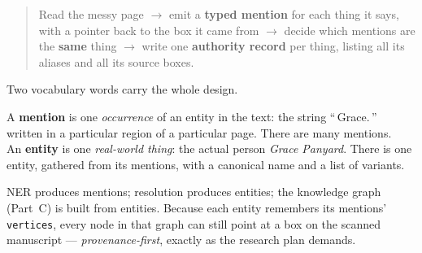 \documentclass[11pt]{article}
\newcommand{\code}[1]{\texttt{#1}}
\begin{document}
\begin{quote}
Read the messy page $\to$ emit a \textbf{typed mention} for each thing it says,
with a pointer back to the box it came from $\to$ decide which mentions are the
\textbf{same} thing $\to$ write one \textbf{authority record} per thing, listing
all its aliases and all its source boxes.
\end{quote}

Two vocabulary words carry the whole design.

\begin{primerbox}
A \textbf{mention} is one \emph{occurrence} of an entity in the text: the string
``\,Grace.\,'' written in a particular region of a particular page. There are many
mentions.\\[4pt]
An \textbf{entity} is one \emph{real-world thing}: the actual person \emph{Grace
Panyard}. There is one entity, gathered from its mentions, with a canonical name
and a list of variants.
\end{primerbox}

NER produces mentions; resolution produces entities; the knowledge graph (Part~C)
is built from entities. Because each entity remembers its mentions' \code{vertices},
every node in that graph can still point at a box on the scanned manuscript ---
\emph{provenance-first}, exactly as the research plan demands.
\end{document}
